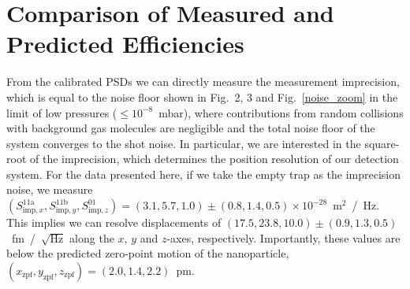 \documentclass[%
 reprint,
 amsmath,amssymb,
 aps,
pra,
]{revtex4-2}
\begin{document}
\section{Comparison of Measured and Predicted Efficiencies}\label{sec:EfficiencyComparison}

From the calibrated PSDs we can directly measure the measurement imprecision, which is equal to the noise floor shown in Fig.~2, 3 and Fig.~\ref{noise_zoom} in the limit of low pressures ($\leq 10^{-8}$~mbar), where contributions from random collisions with background gas molecules are negligible and the total noise floor of the system converges to the shot noise. In particular, we are interested in the square-root of the imprecision, which determines the position resolution of our detection system. For the data presented here, if we take the empty trap as the imprecision noise, we measure  $(S_{\mathrm{imp}, x}^{11\mathrm{a}}, S_{\mathrm{imp}, y}^{11\mathrm{b}}, S_{\mathrm{imp}, z}^{01}) = (3.1, 5.7, 1.0)\pm(0.8, 1.4, 0.5) \times 10^{-28}$~m$^{2}$~/~Hz. This implies we can resolve displacements of $(17.5, 23.8, 10.0)\pm(0.9, 1.3, 0.5)$~fm~/~$\sqrt{\mathrm{Hz}}$ along the $x$, $y$ and $z$-axes, respectively. Importantly, these values are below the predicted zero-point motion of the nanoparticle, $(x_{\mathrm{zpf}}, y_{\mathrm{zpf}}, z_{\mathrm{zpf}}) = (2.0, 1.4, 2.2)$~pm.
\end{document}
